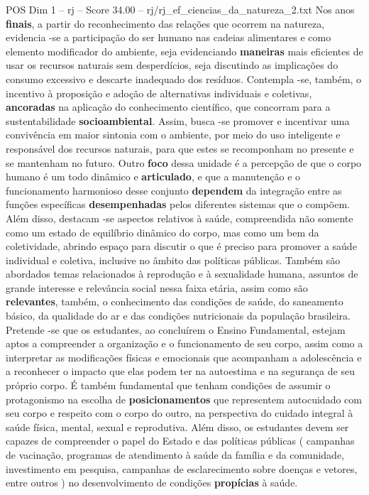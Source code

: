 \begin{textsample}{POS Dim 1 – rj – Score 34.00 – rj/rj\_ef\_ciencias\_da\_natureza\_2.txt}
Nos anos \textbf{finais}, a partir do reconhecimento das relações que ocorrem na natureza, evidencia -se a participação do ser humano nas cadeias alimentares e como elemento modificador do ambiente, seja evidenciando \textbf{maneiras} mais eficientes de usar os recursos naturais sem desperdícios, seja discutindo as implicações do consumo excessivo e descarte inadequado dos resíduos.
Contempla -se, também, o incentivo à proposição e adoção de alternativas individuais e coletivas, \textbf{ancoradas} na aplicação do conhecimento científico, que concorram para a sustentabilidade \textbf{socioambiental}.
Assim, busca -se promover e incentivar uma convivência em maior sintonia com o ambiente, por meio do uso inteligente e responsável dos recursos naturais, para que estes se recomponham no presente e se mantenham no futuro.
Outro \textbf{foco} dessa unidade é a percepção de que o corpo humano é um todo dinâmico e \textbf{articulado}, e que a manutenção e o funcionamento harmonioso desse conjunto \textbf{dependem} da integração entre as funções específicas \textbf{desempenhadas} pelos diferentes sistemas que o compõem.
Além disso, destacam -se aspectos relativos à saúde, compreendida não somente como um estado de equilíbrio dinâmico do corpo, mas como um bem da coletividade, abrindo espaço para discutir o que é preciso para promover a saúde individual e coletiva, inclusive no âmbito das políticas públicas.
Também são abordados temas relacionados à reprodução e à sexualidade humana, assuntos de grande interesse e relevância social nessa faixa etária, assim como são \textbf{relevantes}, também, o conhecimento das condições de saúde, do saneamento básico, da qualidade do ar e das condições nutricionais da população brasileira.
Pretende -se que os estudantes, ao concluírem o Ensino Fundamental, estejam aptos a compreender a organização e o funcionamento de seu corpo, assim como a interpretar as modificações físicas e emocionais que acompanham a adolescência e a reconhecer o impacto que elas podem ter na autoestima e na segurança de seu próprio corpo.
É também fundamental que tenham condições de assumir o protagonismo na escolha de \textbf{posicionamentos} que representem autocuidado com seu corpo e respeito com o corpo do outro, na perspectiva do cuidado integral à saúde física, mental, sexual e reprodutiva.
Além disso, os estudantes devem ser capazes de compreender o papel do Estado e das políticas públicas ( campanhas de vacinação, programas de atendimento à saúde da família e da comunidade, investimento em pesquisa, campanhas de esclarecimento sobre doenças e vetores, entre outros ) no desenvolvimento de condições \textbf{propícias} à saúde.

\end{textsample}

